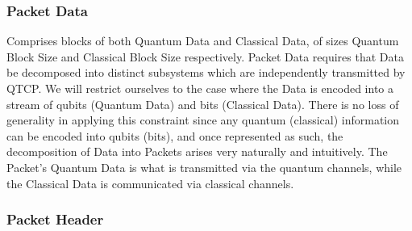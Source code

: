 \documentclass[aps,rmp,twocolumn,amsmath,amssymb,nofootinbib,superscriptaddress]{revtex4}
\begin{document}
%
%

\subsubsection{Packet Data}

Comprises blocks of both {\sc Quantum Data} and {\sc Classical Data}, of sizes {\sc Quantum Block Size} and {\sc Classical Block Size} respectively. {\sc Packet Data} requires that {\sc Data} be decomposed into distinct subsystems which are independently transmitted by QTCP. We will restrict ourselves to the case where the {\sc Data} is encoded into a stream of qubits ({\sc Quantum Data}) and bits ({\sc Classical Data}). There is no loss of generality in applying this constraint since any quantum (classical) information can be encoded into qubits (bits), and once represented as such, the decomposition of {\sc Data} into {\sc Packets} arises very naturally and intuitively. The {\sc Packet's} {\sc Quantum Data} is what is transmitted via the quantum channels, while the {\sc Classical Data} is communicated via classical channels.

%
%

\subsubsection{Packet Header} \label{sec:packet_header}
\end{document}
